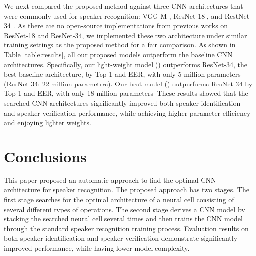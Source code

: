 \documentclass[a4paper]{article}
\begin{document}
We next compared the proposed method against three CNN architectures that were commonly used for speaker recognition: VGG-M \cite{nagrani2017voxceleb}, ResNet-18 \cite{hajibabaei2018unified, bhattacharya2019deep}, and RestNet-34 \cite{chung2018voxceleb2, xie2019utterance, cai2018exploring}. As there are no open-source implementations from previous works on ResNet-18 and ResNet-34, we implemented these two architecture under similar training settings as the proposed method for a fair comparison. As shown in Table \ref{table:results}, all our proposed models outperform the baseline CNN architectures. Specifically, our light-weight model () outperforms ResNet-34, the best baseline architecture, by  Top-1 and  EER, with only 5 million parameters (ResNet-34: 22 million parameters). Our best model () outperforms ResNet-34 by  Top-1 and  EER, with only 18 million parameters. These results showed that the searched CNN architectures significantly improved both speaker identification and speaker verification performance, while achieving higher parameter efficiency and enjoying lighter weights.


\section{Conclusions}
\label{sec:conclusions}
This paper proposed an automatic approach to find the optimal CNN architecture for speaker recognition. The proposed approach has two stages. The first stage searches for the optimal architecture of a neural cell consisting of several different types of operations. The second stage derives a CNN model by stacking the searched neural cell several times and then trains the CNN model through the standard speaker recognition training process. Evaluation results on both speaker identification and speaker verification demonstrate significantly improved performance, while having lower model complexity.





\end{document}
